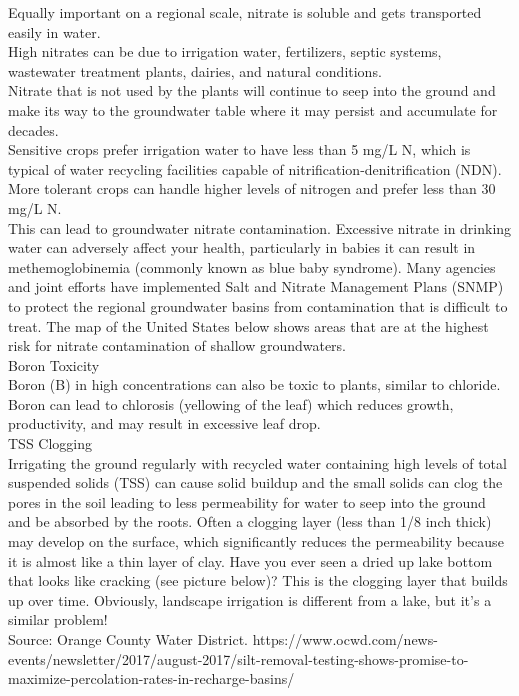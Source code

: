 \documentclass{article}
\begin{document}
Equally important on a regional scale, nitrate is soluble and gets transported easily in water. \\ High nitrates can be due to irrigation water, fertilizers, septic systems, wastewater treatment plants, dairies, and natural conditions. \\ Nitrate that is not used by the plants will continue to seep into the ground and make its way to the groundwater table where it may persist and accumulate for decades.  \\
Sensitive crops prefer irrigation water to have less than 5 mg/L N, which is typical of water recycling facilities capable of nitrification-denitrification (NDN).  More tolerant crops can handle higher levels of nitrogen and prefer less than 30 mg/L N.\\
This can lead to groundwater nitrate contamination.  Excessive nitrate in drinking water can adversely affect your health, particularly in babies it can result in methemoglobinemia (commonly known as blue baby syndrome).  Many agencies and joint efforts have implemented Salt and Nitrate Management Plans (SNMP) to protect the regional groundwater basins from contamination that is difficult to treat. The map of the United States below shows areas that are at the highest risk for nitrate contamination of shallow groundwaters.\\
 
Boron Toxicity\\
Boron (B) in high concentrations can also be toxic to plants, similar to chloride.  Boron can lead to chlorosis (yellowing of the leaf) which reduces growth, productivity, and may result in excessive leaf drop.\\ 
TSS Clogging\\
Irrigating the ground regularly with recycled water containing high levels of total suspended solids (TSS) can cause solid buildup and the small solids can clog the pores in the soil leading to less permeability for water to seep into the ground and be absorbed by the roots.  Often a clogging layer (less than 1/8 inch thick) may develop on the surface, which significantly reduces the permeability because it is almost like a thin layer of clay.  Have you ever seen a dried up lake bottom that looks like cracking (see picture below)?  This is the clogging layer that builds up over time.  Obviously, landscape irrigation is different from a lake, but it's a similar problem!\\
   
Source:  Orange County Water District. https://www.ocwd.com/news-events/newsletter/2017/august-2017/silt-removal-testing-shows-promise-to-maximize-percolation-rates-in-recharge-basins/  
 
\end{document}

